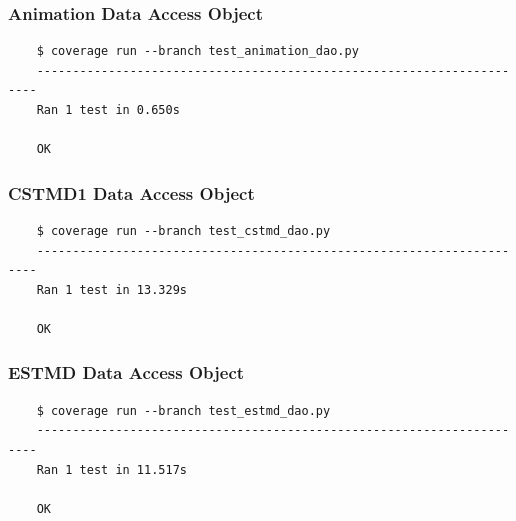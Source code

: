 \documentclass[a4paper,11pt]{article}
\begin{document}
\subsubsection*{{\hspace{6mm}}Animation Data Access Object}
\begin{verbatim}
    $ coverage run --branch test_animation_dao.py
    ----------------------------------------------------------------------
    Ran 1 test in 0.650s

    OK
\end{verbatim}

\subsubsection*{{\hspace{6mm}}CSTMD1 Data Access Object}
\begin{verbatim}
    $ coverage run --branch test_cstmd_dao.py
    ----------------------------------------------------------------------
    Ran 1 test in 13.329s

    OK
\end{verbatim}
  
\subsubsection*{{\hspace{6mm}}ESTMD Data Access Object}
\begin{verbatim}
    $ coverage run --branch test_estmd_dao.py
    ----------------------------------------------------------------------
    Ran 1 test in 11.517s

    OK
\end{verbatim}  
\end{document}
